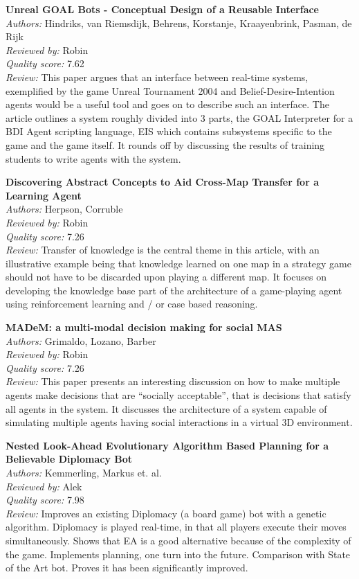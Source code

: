 {\textbf{Unreal GOAL Bots - Conceptual Design of a Reusable Interface\cite{Hindriks:2011}}\\
\textit{Authors:} Hindriks, van Riemsdijk, Behrens, Korstanje, Kraayenbrink, Pasman, de Rijk\\
\textit{Reviewed by:} Robin\\
\textit{Quality score:} 7.62\\
\textit{Review:} This paper argues that an interface between real-time systems, exemplified by the game Unreal Tournament 2004 and Belief-Desire-Intention agents would be a useful tool and goes on to describe such an interface. The article outlines a system roughly divided into 3 parts, the GOAL Interpreter for a BDI Agent scripting language, EIS which contains subsystems specific to the game and the game itself. It rounds off by discussing the results of training students to write agents with the system.

\textbf{Discovering Abstract Concepts to Aid Cross-Map Transfer for a Learning Agent\cite{Herpson:2009}}\\
\textit{Authors:} Herpson, Corruble\\
\textit{Reviewed by:} Robin\\
\textit{Quality score:} 7.26\\
\textit{Review:} Transfer of knowledge is the central theme in this article, with an illustrative example being that knowledge learned on one map in a strategy game should not have to be discarded upon playing a different map. It focuses on developing the knowledge base part of the architecture of a game-playing agent using reinforcement learning and / or case based reasoning.

\textbf{MADeM: a multi-modal decision making for social MAS\cite{Grimaldo:2008}}\\
\textit{Authors:} Grimaldo, Lozano, Barber\\
\textit{Reviewed by:} Robin\\
\textit{Quality score:} 7.26\\
\textit{Review:} This paper presents an interesting discussion on how to make multiple agents make decisions that are ``socially acceptable'', that is decisions that satisfy all agents in the system. It discusses the architecture of a system capable of simulating multiple agents having social interactions in a virtual 3D environment. 

\textbf{Nested Look-Ahead Evolutionary Algorithm Based Planning for a Believable Diplomacy Bot\cite{kemmerling2011nested}}\\
\textit{Authors:} Kemmerling, Markus et. al.\\
\textit{Reviewed by:} Alek	\\
\textit{Quality score:} 7.98\\
\textit{Review:} Improves an existing Diplomacy (a board game) bot with a genetic algorithm. Diplomacy is played real-time, in that all players execute their moves simultaneously. Shows that EA is a good alternative because of the complexity of the game. Implements planning, one turn into the future. Comparison with State of the Art bot. Proves it has been significantly improved.

}

